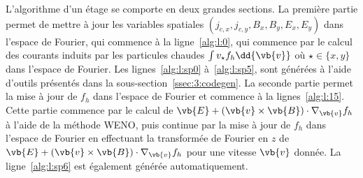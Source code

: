 L'algorithme d'un étage se comporte en deux grandes sections. La première partie permet de mettre à jour les variables spatiales $(j_{c,x},j_{c,y},B_x,B_y,E_x,E_y)$ dans l'espace de Fourier, qui commence à la ligne~\ref{alg:l:0}, qui commence par le calcul des courants induits par les particules chaudes $\int v_\star f_h\dd{\vb{v}}$ où $\star\in\{x,y\}$ dans l'espace de Fourier. Les lignes~\ref{alg:l:sp0} à~\ref{alg:l:sp5}, sont générées à l'aide d'outils présentés dans la sous-section~\ref{ssec:3:codegen}. La seconde partie permet la mise à jour de $f_h$ dans l'espace de Fourier et commence à la lignes~\ref{alg:l:15}. Cette partie commence par le calcul de $\vb{E}+(\vb{v}\times\vb{B})\cdot\nabla_{\vb{v}}f_h$ à l'aide de la méthode WENO, puis continue par la mise à jour de $f_h$ dans l'espace de Fourier en effectuant la transformée de Fourier en $z$ de $\vb{E}+(\vb{v}\times\vb{B})\cdot\nabla_{\vb{v}}f_h$ pour une vitesse $\vb{v}$ donnée. La ligne~\ref{alg:l:sp6} est également générée automatiquement.


